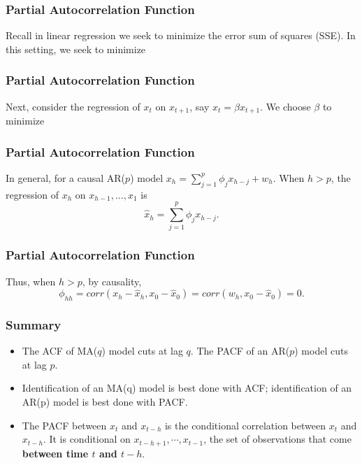 \documentclass[%
xcolor=pdftex]{beamer}
\begin{document}
\begin{frame}
\frametitle{Partial Autocorrelation Function}

Recall in linear regression we seek to minimize the error sum of squares (SSE). In this setting, we seek to minimize

\vspace{50mm}

\end{frame}

\begin{frame}
\frametitle{Partial Autocorrelation Function}

Next, consider the regression of $x_t$ on $x_{t+1}$, say
$\hat{x}_t=\beta x_{t+1}$. We choose $\beta$ to minimize

\vspace{50mm}

\end{frame}

\begin{frame}
\frametitle{Partial Autocorrelation Function}

In general, for a causal AR($p$) model $x_h=\sum^p_{j=1}\phi_j
x_{h-j}+w_h$. When $h>p$, the regression of $x_h$ on
$x_{h-1},\ldots,x_1$ is
$$
\hat{x}_{h} = \sum^p_{j=1} \phi_j x_{h-j}.
$$

\end{frame}

\begin{frame}
\frametitle{Partial Autocorrelation Function}

Thus, when $h>p$, by causality,
$$
\phi_{hh} = corr(x_h-\hat{x}_{h},x_0-\hat{x}_{0}) = corr(w_h,x_0-\hat{x}_{0}) = 0.
$$

\end{frame}

\begin{frame}
\frametitle{Summary}

\begin{itemize}
\item The ACF of MA($q$) model cuts at lag $q$. The PACF of an AR($p$) model cuts at lag $p$.
\item Identification of an MA(q) model is best done with ACF; identification of an AR(p) model is best done with PACF.
\item The PACF between $x_t$ and $x_{t-h}$ is the conditional correlation between $x_t$ and $x_{t-h}$. It is conditional on $x_{t-h+1}, \cdots, x_{t-1}$, the set of observations that come \textbf{between time $t$ and $t-h$}.
\end{itemize}

\end{frame}
\end{document}
